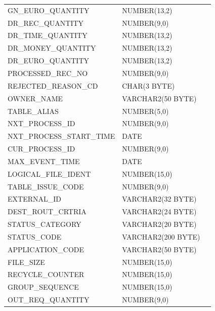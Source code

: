 \documentclass[12pt,twoside]{article}
\begin{document}
\begin{longtable}{lll}
 GN\_EURO\_QUANTITY            &  NUMBER(13,2)        &               \\
 DR\_REC\_QUANTITY             &  NUMBER(9,0)         &               \\
 DR\_TIME\_QUANTITY            &  NUMBER(13,2)        &               \\
 DR\_MONEY\_QUANTITY           &  NUMBER(13,2)        &               \\
 DR\_EURO\_QUANTITY            &  NUMBER(13,2)        &               \\
 PROCESSED\_REC\_NO            &  NUMBER(9,0)         &               \\
 REJECTED\_REASON\_CD          &  CHAR(3 BYTE)        &               \\
 OWNER\_NAME                   &  VARCHAR2(50 BYTE)   &               \\
 TABLE\_ALIAS                  &  NUMBER(5,0)         &               \\
 NXT\_PROCESS\_ID              &  NUMBER(9,0)         &               \\
 NXT\_PROCESS\_START\_TIME     &  DATE                &               \\
 CUR\_PROCESS\_ID              &  NUMBER(9,0)         &               \\
 MAX\_EVENT\_TIME              &  DATE                &               \\
 LOGICAL\_FILE\_IDENT          &  NUMBER(15,0)        &               \\
 TABLE\_ISSUE\_CODE            &  NUMBER(9,0)         &               \\
 EXTERNAL\_ID                  &  VARCHAR2(32 BYTE)   &               \\
 DEST\_ROUT\_CRTRIA            &  VARCHAR2(24 BYTE)   &               \\
 STATUS\_CATEGORY              &  VARCHAR2(20 BYTE)   &               \\
 STATUS\_CODE                  &  VARCHAR2(200 BYTE)  &               \\
 APPLICATION\_CODE             &  VARCHAR2(50 BYTE)   &               \\
 FILE\_SIZE                    &  NUMBER(15,0)        &               \\
 RECYCLE\_COUNTER              &  NUMBER(15,0)        &               \\
 GROUP\_SEQUENCE               &  NUMBER(15,0)        &               \\
 OUT\_REQ\_QUANTITY            &  NUMBER(9,0)         &               \\

\end{longtable}
\end{document}
